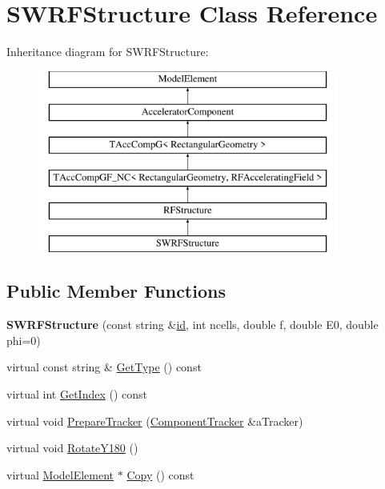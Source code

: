 \hypertarget{classSWRFStructure}{}\section{S\+W\+R\+F\+Structure Class Reference}
\label{classSWRFStructure}
Inheritance diagram for S\+W\+R\+F\+Structure\+:\begin{figure}[H]
\begin{center}
\leavevmode
\includegraphics[height=6.000000cm]{classSWRFStructure}
\end{center}
\end{figure}
\subsection*{Public Member Functions}
\begin{DoxyCompactItemize}
\item 
\mbox{\label{classSWRFStructure_a92c832d1ea48ab325d00a61e6d2c92bd}} 
{\bfseries S\+W\+R\+F\+Structure} (const string \&\hyperlink{classModelElement_aada171ead2085c75b592cf07d91bc5c2}{id}, int ncells, double f, double E0, double phi=0)
\item 
virtual const string \& \hyperlink{classSWRFStructure_aad97277c40295deeda896f9d710330e7}{Get\+Type} () const
\item 
virtual int \hyperlink{classSWRFStructure_aad7467d215cafd843e9a8ad551307ce2}{Get\+Index} () const
\item 
virtual void \hyperlink{classSWRFStructure_a94055441f2ca53c2ccf20e7a07c502b8}{Prepare\+Tracker} (\hyperlink{classComponentTracker}{Component\+Tracker} \&a\+Tracker)
\item 
virtual void \hyperlink{classSWRFStructure_a886ea9cbbef4255f784f440be7c45a91}{Rotate\+Y180} ()
\item 
virtual \hyperlink{classModelElement}{Model\+Element} $\ast$ \hyperlink{classSWRFStructure_a7dac196eefbb13ccb9e5f40e2af40356}{Copy} () const
\end{DoxyCompactItemize}
